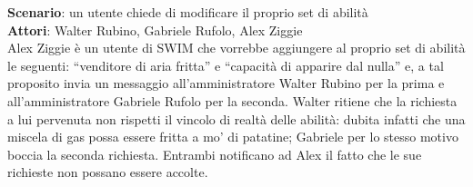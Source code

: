 \documentclass[a4paper,12pt]{article}
\begin{document}
\textbf{Scenario}: un utente chiede di modificare il proprio set di abilità \\
\textbf{Attori}: Walter Rubino, Gabriele Rufolo, Alex Ziggie \\
Alex Ziggie è un utente di SWIM che vorrebbe aggiungere al proprio set di abilità le seguenti: “venditore di aria fritta” e “capacità di apparire dal nulla” e, a tal proposito invia un messaggio all'amministratore Walter Rubino per la prima e all'amministratore Gabriele Rufolo per la seconda. Walter ritiene che la richiesta a lui pervenuta non rispetti il vincolo di realtà delle abilità: dubita infatti che una miscela di gas possa essere fritta a mo' di patatine; Gabriele per lo stesso motivo boccia la seconda richiesta. Entrambi notificano ad Alex il fatto che le sue richieste non possano essere accolte.
\end{document}
